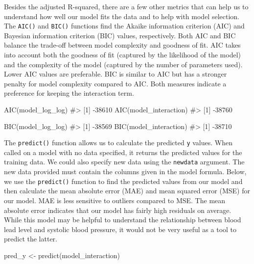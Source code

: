 \documentclass[
  letterpaper,
]{krantz}
\makeatletter
\newenvironment{Shaded}{\begin{snugshade}}{\end{snugshade}}
\newcommand{\CommentTok}[1]{\textcolor[rgb]{0.37,0.37,0.37}{#1}}
\newcommand{\FunctionTok}[1]{\textcolor[rgb]{0.28,0.35,0.67}{#1}}
\newcommand{\NormalTok}[1]{\textcolor[rgb]{0.00,0.23,0.31}{#1}}
\newcommand{\OtherTok}[1]{\textcolor[rgb]{0.00,0.23,0.31}{#1}}
\newenvironment{kframe}{%
\medskip{}
\setlength{\fboxsep}{.8em}
 \def\at@end@of@kframe{}%
 \ifinner\ifhmode%
  \def\at@end@of@kframe{\end{minipage}}%
  \begin{minipage}{\columnwidth}%
 \fi\fi%
 \def\FrameCommand##1{\hskip\@totalleftmargin \hskip-\fboxsep
 \colorbox{shadecolor}{##1}\hskip-\fboxsep
     \hskip-\linewidth \hskip-\@totalleftmargin \hskip\columnwidth}%
 \MakeFramed {\advance\hsize-\width
   \@totalleftmargin\z@ \linewidth\hsize
   \@setminipage}}%
 {\par\unskip\endMakeFramed%
 \at@end@of@kframe}
\renewenvironment{Shaded}{\begin{kframe}}{\end{kframe}}
\makeatother
\begin{document}
Besides the adjusted R-squared, there are a few other metrics that can
help us to understand how well our model fits the data and to help with
model selection. The \texttt{AIC()} and \texttt{BIC()} functions find
the Akaike information criterion (AIC) and Bayesian information
criterion (BIC) values, respectively. Both AIC and BIC balance the
trade-off between model complexity and goodness of fit. AIC takes into
account both the goodness of fit (captured by the likelihood of the
model) and the complexity of the model (captured by the number of
parameters used). Lower AIC values are preferable. BIC is similar to AIC
but has a stronger penalty for model complexity compared to AIC. Both
measures indicate a preference for keeping the interaction term.

\begin{Shaded}
\begin{Highlighting}[]
\FunctionTok{AIC}\NormalTok{(model\_log\_log)}
\CommentTok{\#\textgreater{} [1] {-}38610}
\FunctionTok{AIC}\NormalTok{(model\_interaction)}
\CommentTok{\#\textgreater{} [1] {-}38760}
\end{Highlighting}
\end{Shaded}

\begin{Shaded}
\begin{Highlighting}[]
\FunctionTok{BIC}\NormalTok{(model\_log\_log)}
\CommentTok{\#\textgreater{} [1] {-}38569}
\FunctionTok{BIC}\NormalTok{(model\_interaction)}
\CommentTok{\#\textgreater{} [1] {-}38710}
\end{Highlighting}
\end{Shaded}

The \texttt{predict()} function allows us to calculate the predicted
\texttt{y} values. When called on a model with no data specified, it
returns the predicted values for the training data. We could also
specify new data using the \texttt{newdata} argument. The new data
provided must contain the columns given in the model formula. Below, we
use the \texttt{predict()} function to find the predicted values from
our model and then calculate the mean absolute error (MAE) and mean
squared error (MSE) for our model. MAE is less sensitive to outliers
compared to MSE. The mean absolute error indicates that our model has
fairly high residuals on average. While this model may be helpful to
understand the relationship between blood lead level and systolic blood
pressure, it would not be very useful as a tool to predict the latter.

\begin{Shaded}
\begin{Highlighting}[]
\NormalTok{pred\_y }\OtherTok{\textless{}{-}} \FunctionTok{predict}\NormalTok{(model\_interaction)}
\end{Highlighting}
\end{Shaded}
\end{document}
